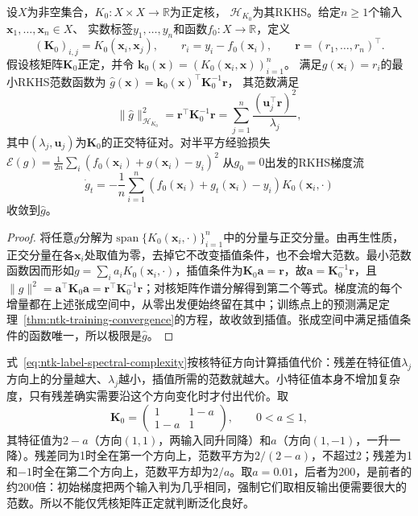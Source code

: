 \begin{theorem}[初始梯度特征的最小范数插值]
\label{thm:ntk-minimum-rkhs-norm}
设$X$为非空集合，$K_0:X\times X\to\mathbb R$为正定核，
$\mathcal H_{K_0}$为其RKHS。给定$n\geq1$个输入$\bm x_1,\ldots,\bm x_n\in X$、
实数标签$y_1,\ldots,y_n$和函数$f_0:X\to\mathbb R$，定义
\[
 (\bm K_0)_{i,j}=K_0(\bm x_i,\bm x_j),\qquad
 r_i=y_i-f_0(\bm x_i),\qquad
 \bm r=(r_1,\ldots,r_n)^\top.
\]
假设核矩阵$\bm K_0$正定，并令
$\bm k_0(\bm x)=(K_0(\bm x_i,\bm x))_{i=1}^{n}$。
满足$g(\bm x_i)=r_i$的最小RKHS范数函数为
$\widehat g(\bm x)=\bm k_0(\bm x)^\top\bm K_0^{-1}\bm r$，
其范数满足
\begin{equation}
 \|\widehat g\|_{\mathcal H_{K_0}}^2
 =\bm r^\top\bm K_0^{-1}\bm r
 =\sum_{j=1}^n\frac{(\bm u_j^\top\bm r)^2}{\lambda_j},
 \label{eq:ntk-label-spectral-complexity}
\end{equation}
其中$(\lambda_j,\bm u_j)$为$\bm K_0$的正交特征对。对半平方经验损失
$\mathcal E(g)=\frac1{2n}\sum_i(f_0(\bm x_i)+g(\bm x_i)-y_i)^2$
从$g_0=0$出发的RKHS梯度流
\[
 \dot g_t=-\frac1n\sum_{i=1}^n
 (f_0(\bm x_i)+g_t(\bm x_i)-y_i)K_0(\bm x_i,\cdot)
\]
收敛到$\widehat g$。
\end{theorem}
\begin{proof}
将任意$g$分解为$\operatorname{span}\{K_0(\bm x_i,\cdot)\}_{i=1}^n$中的分量与正交分量。由再生性质，正交分量在各$\bm x_i$处取值为零，去掉它不改变插值条件，也不会增大范数。最小范数函数因而形如$g=\sum_i a_iK_0(\bm x_i,\cdot)$，插值条件为$\bm K_0\bm a=\bm r$，故$\bm a=\bm K_0^{-1}\bm r$，且$\|g\|^2=\bm a^\top\bm K_0\bm a=\bm r^\top\bm K_0^{-1}\bm r$；对核矩阵作谱分解得到第二个等式。梯度流的每个增量都在上述张成空间中，从零出发便始终留在其中；训练点上的预测满足定理~\ref{thm:ntk-training-convergence}的方程，故收敛到插值。张成空间中满足插值条件的函数唯一，所以极限是$\widehat g$。
\end{proof}

式~\eqref{eq:ntk-label-spectral-complexity}按核特征方向计算插值代价：残差在特征值$\lambda_j$方向上的分量越大、$\lambda_j$越小，插值所需的范数就越大。小特征值本身不增加复杂度，只有残差确实需要沿这个方向变化时才付出代价。取
\[
 \bm K_0=\begin{pmatrix}1&1-a\\1-a&1\end{pmatrix},\qquad 0<a\leq1,
\]
其特征值为$2-a$（方向$(1,1)$，两输入同升同降）和$a$（方向$(1,-1)$，一升一降）。残差同为1时全在第一个方向上，范数平方为$2/(2-a)$，不超过2；残差为1和$-1$时全在第二个方向上，范数平方却为$2/a$。取$a=0.01$，后者为200，是前者的约200倍：初始梯度把两个输入判为几乎相同，强制它们取相反输出便需要很大的范数。所以不能仅凭核矩阵正定就判断泛化良好。

